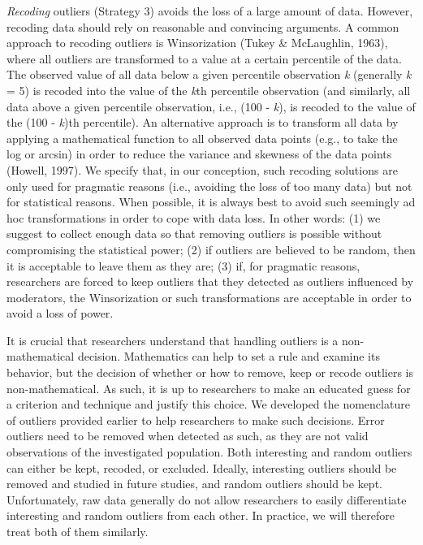 \documentclass[man,floatsintext]{apa6}
\begin{document}
\emph{Recoding} outliers (Strategy 3) avoids the loss of a large amount of data. However, recoding data should rely on reasonable and convincing arguments. A common approach to recoding outliers is Winsorization (Tukey \& McLaughlin, 1963), where all outliers are transformed to a value at a certain percentile of the data. The observed value of all data below a given percentile observation \emph{k} (generally \emph{k} = 5) is recoded into the value of the \emph{k}th percentile observation (and similarly, all data above a given percentile observation, i.e., (100 - \emph{k}), is recoded to the value of the (100 - \emph{k})th percentile). An alternative approach is to transform all data by applying a mathematical function to all observed data points (e.g., to take the log or arcsin) in order to reduce the variance and skewness of the data points (Howell, 1997). We specify that, in our conception, such recoding solutions are only used for pragmatic reasons (i.e., avoiding the loss of too many data) but not for statistical reasons. When possible, it is always best to avoid such seemingly ad hoc transformations in order to cope with data loss. In other words: (1) we suggest to collect enough data so that removing outliers is possible without compromising the statistical power; (2) if outliers are believed to be random, then it is acceptable to leave them as they are; (3) if, for pragmatic reasons, researchers are forced to keep outliers that they detected as outliers influenced by moderators, the Winsorization or such transformations are acceptable in order to avoid a loss of power.

It is crucial that researchers understand that handling outliers is a non-mathematical decision. Mathematics can help to set a rule and examine its behavior, but the decision of whether or how to remove, keep or recode outliers is non-mathematical. As such, it is up to researchers to make an educated guess for a criterion and technique and justify this choice. We developed the nomenclature of outliers provided earlier to help researchers to make such decisions. Error outliers need to be removed when detected as such, as they are not valid observations of the investigated population. Both interesting and random outliers can either be kept, recoded, or excluded. Ideally, interesting outliers should be removed and studied in future studies, and random outliers should be kept. Unfortunately, raw data generally do not allow researchers to easily differentiate interesting and random outliers from each other. In practice, we will therefore treat both of them similarly.
\end{document}

